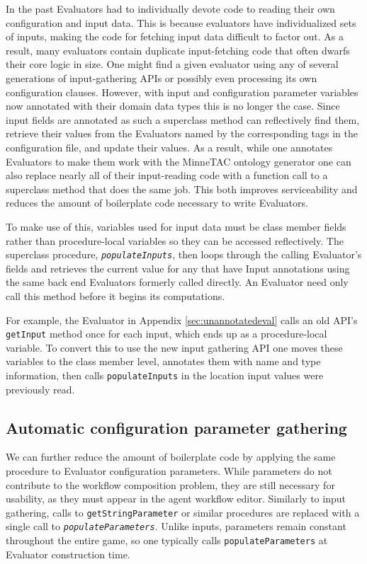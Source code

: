 \documentclass{article}
\begin{document}
In the past Evaluators had to individually devote code to reading their own configuration and input data.
This is because evaluators have individualized sets of inputs, making the code for fetching input data difficult to factor out.
As a result, many evaluators contain duplicate input-fetching code that often dwarfs their core logic in size.
One might find a given evaluator using any of several generations of input-gathering APIs or possibly even processing its own configuration clauses.
However, with input and configuration parameter variables now annotated with their domain data types this is no longer the case.
Since input fields are annotated as such a superclass method can reflectively find them, retrieve their values from the Evaluators named by the corresponding tags in the configuration file, and update their values.
As a result, while one annotates Evaluators to make them work with the MinneTAC ontology generator one can also replace nearly all of their input-reading code with a function call to a superclass method that does the same job.
This both improves serviceability and reduces the amount of boilerplate code necessary to write Evaluators.

To make use of this, variables used for input data must be class member fields rather than procedure-local variables so they can be accessed reflectively.
The superclass procedure, \emph{\texttt{populateInputs}}, then loops through the calling Evaluator's fields and retrieves the current value for any that have Input annotations using the same back end Evaluators formerly called directly.
An Evaluator need only call this method before it begins its computations.

For example, the Evaluator in Appendix \ref{sec:unannotatedeval} calls an old API's \texttt{getInput} method once for each input, which ends up as a procedure-local variable.
To convert this to use the new input gathering API one moves these variables to the class member level, annotates them with name and type information, then calls \texttt{populateInputs} in the location input values were previously read.

\subsection{Automatic configuration parameter gathering}

We can further reduce the amount of boilerplate code by applying the same procedure to Evaluator configuration parameters.
While parameters do not contribute to the workflow composition problem, they are still necessary for usability, as they must appear in the agent workflow editor.
Similarly to input gathering, calls to \texttt{getStringParameter} or similar procedures are replaced with a single call to \emph{\texttt{populateParameters}}.
Unlike inputs, parameters remain constant throughout the entire game, so one typically calls \texttt{populateParameters} at Evaluator construction time.
\end{document}
